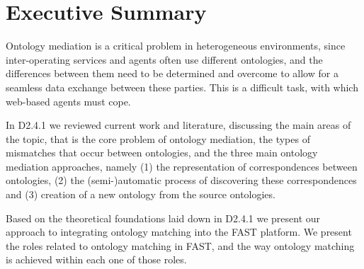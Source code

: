 \documentclass{fast_latex}
\begin{document}
\newpage


\clearpage

\section*{Executive Summary}
\doublespacing
Ontology mediation is a critical problem in heterogeneous environments, since inter-operating services and agents often use different
ontologies, and the differences between them need to be determined and overcome to allow for a seamless data exchange between these parties.
This is a difficult task, with which web-based agents must cope. 

In D2.4.1 we reviewed current work and literature, discussing the main areas of the topic, that is the core problem of ontology mediation, the types of mismatches that occur between ontologies, and the three main ontology mediation approaches, namely (1) the representation of correspondences between ontologies, (2) the (semi-)automatic process of discovering these correspondences and (3) creation of a new ontology from the source ontologies. 

Based on the theoretical foundations laid down in D2.4.1 we present our approach to integrating ontology matching into the FAST platform. We present the roles related to ontology matching in FAST, and the way ontology matching is achieved within each one of those roles.

\newpage


\clearpage
\end{document}
